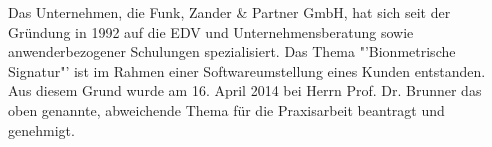 Das Unternehmen, die Funk, Zander \& Partner GmbH, hat sich seit der Gründung in 1992 auf die EDV und Unternehmensberatung sowie anwenderbezogener Schulungen spezialisiert. Das Thema "'Bionmetrische Signatur"' ist im Rahmen einer Softwareumstellung eines Kunden entstanden. Aus diesem Grund wurde am 16. April 2014 bei Herrn Prof. Dr. Brunner das oben genannte, abweichende Thema für die Praxisarbeit beantragt und genehmigt.
